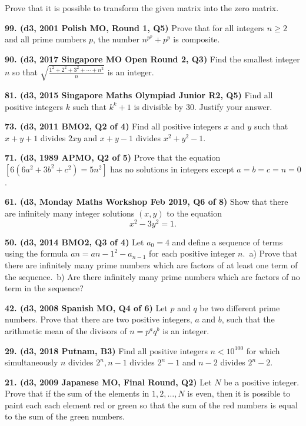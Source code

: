 \documentclass{article}
\begin{document}
Prove that it is possible to transform the given matrix into the zero matrix.

\textbf{99. (\color{red}d3\color{black}, 2001 Polish MO, Round 1, Q5)} Prove that for all integers \(n \geq 2\) and all prime numbers \(p\), the number \(n^{p^p} + p^p\) is composite.

\textbf{90. (\color{red}d3\color{black}, 2017 Singapore MO Open Round 2, Q3)} Find the smallest integer $n$ so that $\sqrt{\frac{1^2+2^2+3^2+ \cdots + n^2}{n}}$ is an integer.

\textbf{81. (\color{red}d3\color{black}, 2015 Singapore Maths Olympiad Junior R2, Q5)} Find all positive integers \(k\) such that \(k^k+1\) is divisible by \(30\). Justify your answer.

\textbf{73. (\color{red}d3\color{black}, 2011 BMO2, Q2 of 4)} Find all positive integers $x$ and $y$ such that $x+y+1$ divides $2xy$ and $x+y-1$ divides $x^2+y^2-1$.

\textbf{71. (\color{red}d3\color{black}, 1989 APMO, Q2 of 5)} Prove that the equation $[6(6a^2+3b^2+c^2)=5n^2]$ has no solutions in integers except $a=b=c=n=0$.

\textbf{61. (\color{red}d3\color{black}, Monday Maths Workshop Feb 2019, Q6 of 8)} Show that there are infinitely many integer solutions $(x, y)$ to the equation \[x^2-3y^2=1.\]

\textbf{50. (\color{red}d3\color{black}, 2014 BMO2, Q3 of 4)} Let $a_0 = 4$ and define a sequence of terms using the formula $an = a{n-1}^2 - a_{n-1}$ for each positive integer $n$.\
a) Prove that there are infinitely many prime numbers which are factors of at least one term of the sequence.\
b) Are there infinitely many prime numbers which are factors of no term in the sequence?

\textbf{42. (\color{red}d3\color{black}, 2008 Spanish MO, Q4 of 6)} Let $p$ and $q$ be two different prime numbers. Prove that there are two positive integers, $a$ and $b$, such that the arithmetic mean of the divisors of $n = p^a q^b$ is an integer.

\textbf{29. (\color{red}d3\color{black}, 2018 Putnam, B3)} Find all positive integers $n < 10^{100}$ for which simultaneously $n$ divides $2^n, n - 1$ divides $2^n - 1$ and $n - 2$ divides $2^n - 2$.

\textbf{21. (\color{red}d3\color{black}, 2009 Japanese MO, Final Round, Q2)} Let $N$ be a positive integer. Prove that if the sum of the elements in ${1,2,\dots,N}$ is even, then it is possible to paint each each element red or green so that the sum of the red numbers is equal to the sum of the green numbers.
\end{document}
